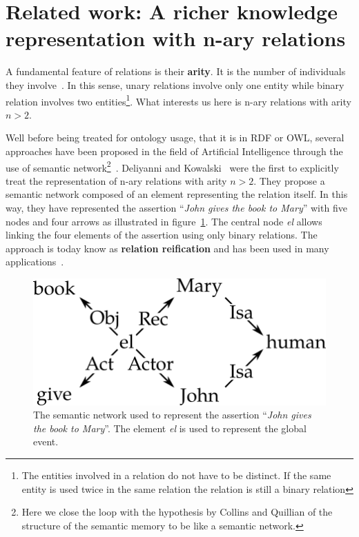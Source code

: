 \section[Related work]{Related work: A richer knowledge representation with n-ary relations}

A fundamental feature of relations is their \textbf{arity}. It is the number of individuals they involve~\cite{giunti_2019_representing}. In this sense, unary relations involve only one entity while binary relation involves two entities\footnote{The entities involved in a relation do not have to be distinct. If the same entity is used twice in the same relation the relation is still a binary relation}. What interests us here is n-ary relations with arity $n > 2$.

Well before being treated for ontology usage, that it is in RDF or OWL, several approaches have been proposed in the field of Artificial Intelligence through the use of semantic network\footnote{Here we close the loop with the hypothesis by Collins and Quillian of the structure of the semantic memory to be like a semantic network.}~\cite{brachman_1979_epistemological, sowa_2014_principles}. Deliyanni and Kowalski~\cite{deliyanni_1979_logic} were the first to explicitly treat the representation of n-ary relations with arity $n > 2$. They propose a semantic network composed of an element representing the relation itself. In this way, they have represented the assertion ``\textit{John gives the book to Mary}'' with five nodes and four arrows as illustrated in figure~\ref{fig:chap7_sem_net}. The central node \textit{el} allows linking the four elements of the assertion using only binary relations. The approach is today know as \textbf{relation reification} and has been used in many applications~\cite{gangemi_2008_norms, welty_2006_reusable}.

\begin{figure}[ht!]
\centering
\includegraphics[scale=0.5]{figures/chapter7/semantic_net.png}
\caption{\label{fig:chap7_sem_net} The semantic network used to represent the assertion ``\textit{John gives the book to Mary}''. The element \textit{el} is used to represent the global event.}
\end{figure}

